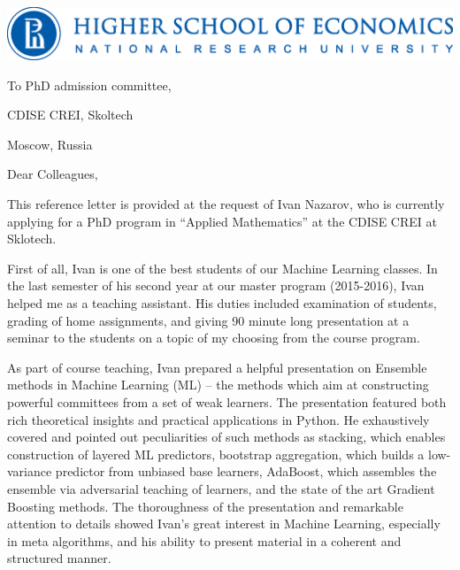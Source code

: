 \documentclass[14pt]{letter}
\begin{document}
%
\includegraphics[scale=0.55]{logo_hse_cmyk_e.eps}

\vspace{1.5cm}

\begin{minipage}{0.5\linewidth}
To PhD admission committee, \par
CDISE CREI, Skoltech \par
Moscow, Russia \par
\end{minipage} \par\bigskip

Dear Colleagues, \par\bigskip

This reference letter is provided at the request of Ivan Nazarov, who is currently applying for a
PhD program in ``Applied Mathematics'' at the CDISE CREI at Sklotech. \par\medskip

First of all, Ivan is one of the best students of our Machine Learning classes. In the last semester
of his second year at our master program (2015-2016), Ivan helped me as a teaching assistant.
His duties included examination of students, grading of home assignments, and giving 90 minute long
presentation at a seminar to the students on a topic of my choosing from the course program.
\par\medskip

As part of course teaching, Ivan prepared a helpful presentation on Ensemble methods in Machine
Learning (ML) -- the methods which aim at constructing powerful committees from a set of weak
learners. The presentation featured both rich theoretical insights and practical applications in
Python. He exhaustively covered and pointed out peculiarities of such methods as stacking, which
enables construction of layered ML predictors, bootstrap aggregation, which builds a low-variance
predictor from unbiased base learners, AdaBoost, which assembles the ensemble via adversarial
teaching of learners, and the state of the art Gradient Boosting methods. The thoroughness of the
presentation and remarkable attention to details showed Ivan's great interest in Machine Learning,
especially in meta algorithms, and his ability to present material in a coherent and structured
manner. \par\medskip
\end{document}
